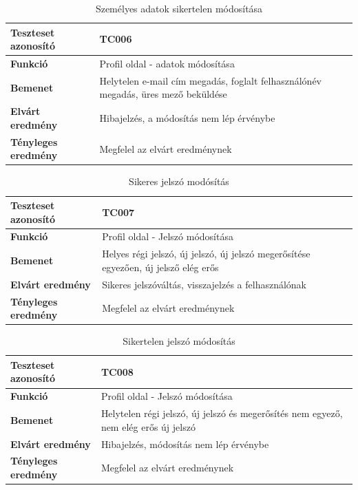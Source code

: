 \begin{table}[h!]
	\centering
	\begin{tabular}{|l|p{10cm}|}
		\hline
		\textbf{Teszteset azonosító} & TC006 \\ \hline
		\textbf{Funkció} & Profil oldal - adatok módosítása \\ \hline
		\textbf{Bemenet} & Helytelen e-mail cím megadás, foglalt felhasználónév megadás, üres mező beküldése \\ \hline
		\textbf{Elvárt eredmény} & Hibajelzés, a módosítás nem lép érvénybe \\ \hline
		\textbf{Tényleges eredmény} & Megfelel az elvárt eredménynek \\ \hline
	\end{tabular}
	\caption{Személyes adatok sikertelen módosítása}
	\label{tab:profil_felhasznalonev_foglalt}
\end{table}


\begin{table}[h!]
	\centering
	\begin{tabular}{|l|p{10cm}|}
		\hline
		\textbf{Teszteset azonosító} & TC007 \\ \hline
		\textbf{Funkció} & Profil oldal - Jelszó módosítása \\ \hline
		\textbf{Bemenet} & Helyes régi jelszó, új jelszó, új jelszó megerősítése egyezően, új jelsző elég erős \\ \hline
		\textbf{Elvárt eredmény} & Sikeres jelszóváltás, visszajelzés a felhasználónak \\ \hline
		\textbf{Tényleges eredmény} & Megfelel az elvárt eredménynek \\ \hline
	\end{tabular}
	\caption{Sikeres jelszó modósítás}
	\label{tab:profil_jelszo_modositas}
\end{table}

\begin{table}[h!]
	\centering
	\begin{tabular}{|l|p{10cm}|}
		\hline
		\textbf{Teszteset azonosító} & TC008 \\ \hline
		\textbf{Funkció} & Profil oldal - Jelszó módosítása \\ \hline
		\textbf{Bemenet} & Helytelen régi jelszó, új jelszó és megerősítés nem egyező, nem elég erős új jelszó \\ \hline
		\textbf{Elvárt eredmény} & Hibajelzés, módosítás nem lép érvénybe \\ \hline
		\textbf{Tényleges eredmény} & Megfelel az elvárt eredménynek \\ \hline
	\end{tabular}
	\caption{Sikertelen jelszó módosítás}
	\label{tab:jelszo_modositas_rossz_regi}
\end{table}

